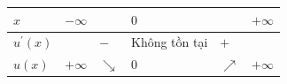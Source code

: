 \documentclass[border=.4pt]{standalone}
\begin{document}
\color{ink}\begin{tabular}{|>{\centering\arraybackslash}m{1.7cm}|>{\centering\arraybackslash}m{1.25cm}|>{\centering\arraybackslash}m{1.25cm}|>{\centering\arraybackslash}m{1.25cm}|>{\centering\arraybackslash}m{1.25cm}|>{\centering\arraybackslash}m{1.25cm}|}\hline
\cellcolor{head}$x$ & \cellcolor{head}$-\infty$ & \cellcolor{head} & \cellcolor{head}$0$ & \cellcolor{head} & \cellcolor{head}$+\infty$ \\ \hline
\cellcolor{head}$u^{\prime}(x)$ &  & $-$ & \scriptsize Không tồn tại & $+$ &  \\ \hline
\cellcolor{head}$u(x)$ & $+\infty$ & \color{focus}\large $\searrow$ & $0$ & \color{focus}\large $\nearrow$ & $+\infty$ \\ \hline\end{tabular}
\end{document}
